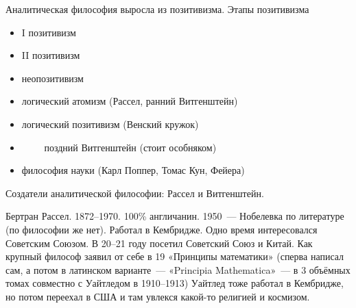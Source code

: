 
Аналитическая философия выросла из позитивизма. 
Этапы позитивизма
\begin{itemize}
	\item I позитивизм
	\item II позитивизм
	\item неопозитивизм 
	\item логический атомизм (Рассел, ранний Витгенштейн)
	\item логический позитивизм (Венский кружок)
	\item $\qquad$ поздний Витгенштейн (стоит особняком)
	\item философия науки (Карл Поппер, Томас Кун, Фейера)
\end{itemize}

Создатели аналитической философии: Рассел и Витгенштейн.

Бертран Рассел. 1872--1970. 100\% англичанин. 1950~--- Нобелевка по литературе (по философии же нет).
Работал в Кембридже. Одно время интересовался Советским Союзом. В 20--21 году посетил Советский Союз и Китай.
Как крупный философ заявил от себе в 19 «Принципы математики» (сперва написал сам, а потом в латинском варианте~--- «Principia Mathematica»~--- в 3 объёмных томах совместно с Уайтледом в 1910--1913)
Уайтлед тоже работал в Кембридже, но потом переехал в США и там увлекся какой-то религией и космизом.
